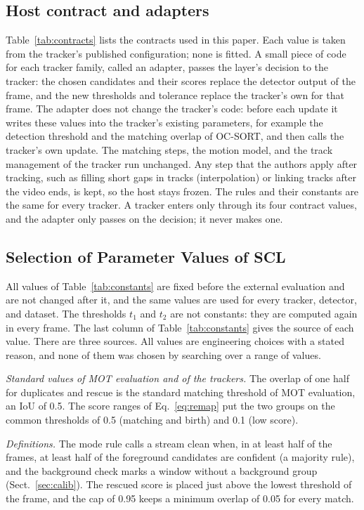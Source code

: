 \subsection{Host contract and adapters}\label{sec:contract}
Table~\ref{tab:contracts} lists the contracts used in this paper. Each value
is taken from the tracker's published configuration; none is fitted. A small
piece of code for each tracker family, called an adapter, passes the layer's
decision to the tracker:
the chosen candidates and their scores replace the detector output of the
frame, and the new thresholds and tolerance replace the tracker's own for
that frame. The adapter does not change the tracker's code: before each
update it writes these values into the tracker's existing parameters, for
example the detection threshold and the matching overlap of OC-SORT, and then
calls the tracker's own update. The matching steps, the motion model, and the
track management of the tracker run unchanged. Any step that the authors apply after tracking, such as
filling short gaps in tracks (interpolation) or linking tracks after the video
ends, is kept, so the host stays frozen. The rules and their constants are
the same for every tracker. A tracker enters only through its four contract
values, and the adapter only passes on the decision; it never makes one.



\subsection{Selection of Parameter Values of SCL}\label{sec:constants}
All values of Table~\ref{tab:constants} are fixed before the external evaluation and are not
changed after it, and the same values are used for every tracker, detector, and dataset. The
thresholds $t_1$ and $t_2$ are not constants: they are computed again in every frame. The last
column of Table~\ref{tab:constants} gives the source of each value. There are three sources. All
values are engineering choices with a stated reason, and none of them was chosen by searching over
a range of values.

\emph{Standard values of MOT evaluation and of the trackers.} The overlap of one half for
duplicates and rescue is the standard matching threshold of MOT evaluation, an IoU of 0.5. The score
ranges of Eq.~\eqref{eq:remap} put the two groups on the common thresholds of 0.5 (matching and
birth) and 0.1 (low score).

\emph{Definitions.} The mode rule calls a stream clean when, in at least half of the frames, at
least half of the foreground candidates are confident (a majority rule), and the background check
marks a window without a background group (Sect.~\ref{sec:calib}). The
rescued score is placed just above the lowest threshold of the frame, and the cap of 0.95 keeps a
minimum overlap of 0.05 for every match.

